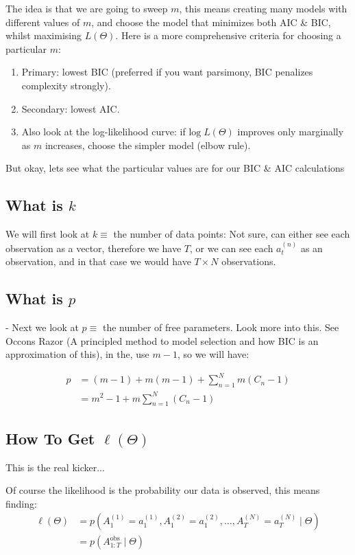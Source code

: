 The idea is that we are going to sweep $m$, this means creating many models with different values of $m$, and choose the model that minimizes both AIC \& BIC, whilst maximising $L(\Theta)$. Here is a more comprehensive criteria for choosing a particular $m$:

\begin{enumerate}
    \item Primary: lowest BIC (preferred if you want parsimony, BIC penalizes complexity strongly).
    \item Secondary: lowest AIC.
    \item Also look at the log-likelihood curve: if $\text{log} \; L(\Theta)$ improves only marginally as $m$ increases, choose the simpler model (elbow rule).
\end{enumerate}

But okay, lets see what the particular values are for our BIC \& AIC calculations


\subsection{What is $k$}
We will first look at $k \equiv$ the number of data points: Not sure, can either see each observation as a vector, therefore we have $T$, or we can see each $a_t^{(n)}$ as an observation, and in that case we would have $T \times N$ observations.

\subsection{What is $p$}
- Next we look at $p \equiv$ the number of free parameters. Look more into this. See Occons Razor (A principled method to model selection and how BIC is an approximation of this), in the, use $m-1$, so we will have:


\[
    \begin{aligned}
        p &= (m-1) + m(m-1) + \sum\limits_{n=1}^N m(C_n - 1) \\ 
        &= m^2 - 1 +m\sum\limits_{n=1}^N (C_n - 1)
    \end{aligned}
\]


\subsection{How To Get $\ell(\Theta)$}

This is the real kicker...
\vspace{1cm}

Of course the likelihood is the probability our data is observed, this means finding:
\[
    \begin{aligned}
        \ell(\Theta) &= p(A_1^{(1)} = a_1^{(1)}, A_1^{(2)} = a_1^{(2)}, \dots, A_T^{(N)} = a_T^{(N)} \mid \Theta) \\ 
        &= p(A_{1:T}^\text{obs} \mid \Theta)
    \end{aligned}
\]

